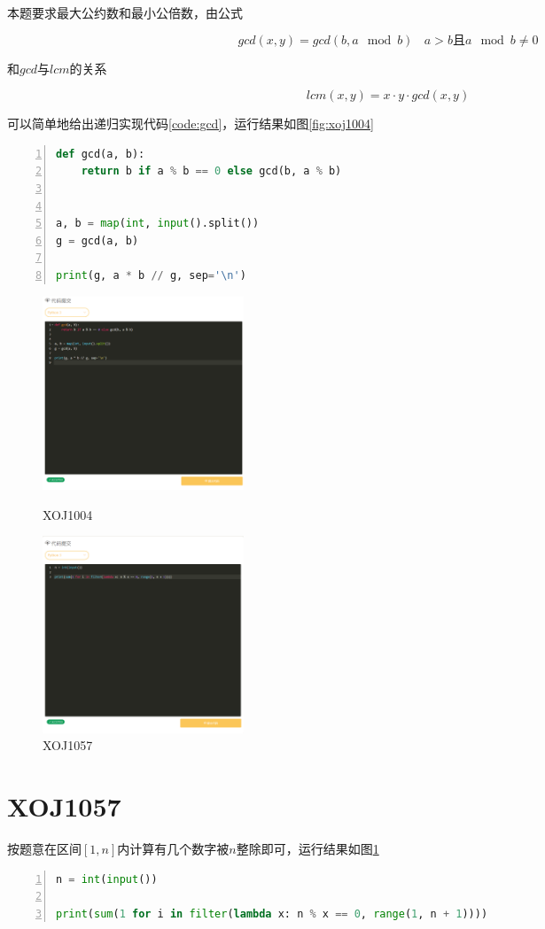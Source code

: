 \documentclass[a4paper,twoside]{article}
\begin{document}
\begin{spacing}{1.2}
本题要求最大公约数和最小公倍数，由公式

$$
gcd(x,y)=gcd(b,a\mod b) \ \ \ \ a>b\mbox{且}a\mod b \ne 0
$$

和$gcd$与$lcm$的关系

$$
lcm(x,y)=x \cdot y \cdot gcd(x,y)
$$

可以简单地给出递归实现代码\ref{code:gcd}，运行结果如图\ref{fig:xoj1004}

\begin{lstlisting}[language=Python,numbers=left,style=PythonStyle,caption=XOJ1004,label={code:gcd}]
def gcd(a, b):
	return b if a % b == 0 else gcd(b, a % b)


a, b = map(int, input().split())
g = gcd(a, b)

print(g, a * b // g, sep='\n')
\end{lstlisting}

\begin{figure}[htbp]
	\centering
	\begin{minipage}[t]{0.48\textwidth}
		\centering
		\includegraphics[width=6cm]{t1.png}
		\caption{XOJ1004}
		\label{fig:xoj1004}
	\end{minipage}
	\begin{minipage}[t]{0.48\textwidth}
		\centering
		\includegraphics[width=6cm]{t2.png}
		\caption{XOJ1057}
		\label{fig:xoj1057}
	\end{minipage}
\end{figure}


\section{XOJ1057}

按题意在区间$[1,n]$内计算有几个数字被$n$整除即可，运行结果如图\ref{fig:xoj1057}

\begin{lstlisting}[language=Python,numbers=left,style=PythonStyle,caption=XOJ1057,label={code:multipier}]
n = int(input())

print(sum(1 for i in filter(lambda x: n % x == 0, range(1, n + 1))))
\end{lstlisting}

\end{spacing}
\end{document}
